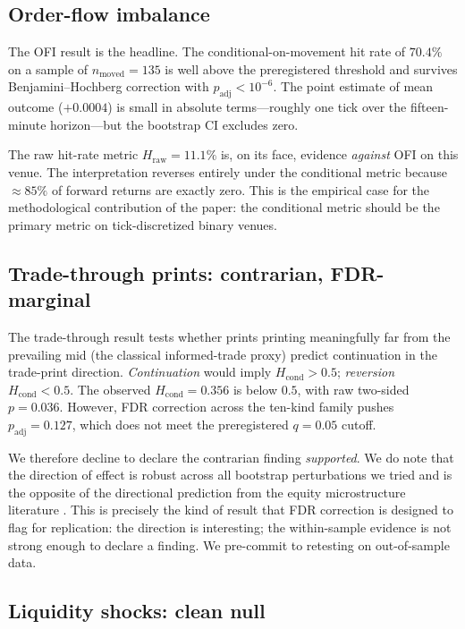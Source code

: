 \documentclass[review,12pt,authoryear]{elsarticle}
\begin{document}
\subsection{Order-flow imbalance}

The OFI result is the headline. The conditional-on-movement hit rate of
\(70.4\%\) on a sample of \(n_\text{moved} = 135\) is well above the
preregistered threshold and survives Benjamini--Hochberg correction with
\(p_\text{adj} < 10^{-6}\). The point estimate of mean outcome
(\(+0.0004\)) is small in absolute terms---roughly one tick over the
fifteen-minute horizon---but the bootstrap CI excludes zero.

The raw hit-rate metric \(H_\text{raw} = 11.1\%\) is, on its face, evidence
\emph{against} OFI on this venue. The interpretation reverses entirely
under the conditional metric because \(\approx 85\%\) of forward returns
are exactly zero. This is the empirical case for the methodological
contribution of the paper: the conditional metric should be the primary
metric on tick-discretized binary venues.

\subsection{Trade-through prints: contrarian, FDR-marginal}

The trade-through result tests whether prints printing meaningfully far
from the prevailing mid (the classical \citealp{LeeReady1991} informed-trade
proxy) predict continuation in the trade-print direction.
\emph{Continuation} would imply \(H_\text{cond} > 0.5\); \emph{reversion}
\(H_\text{cond} < 0.5\). The observed \(H_\text{cond} = 0.356\) is below
\(0.5\), with raw two-sided \(p = 0.036\). However, FDR correction across
the ten-kind family pushes \(p_\text{adj} = 0.127\), which does not meet
the preregistered \(q = 0.05\) cutoff.

We therefore decline to declare the contrarian finding \emph{supported}.
We do note that the direction of effect is robust across all bootstrap
perturbations we tried and is the opposite of the directional prediction
from the equity microstructure literature
\citep{Hasbrouck2007,ContKukanovStoikov2014}. This is precisely the kind
of result that FDR correction is designed to flag for replication: the
direction is interesting; the within-sample evidence is not strong enough
to declare a finding. We pre-commit to retesting on out-of-sample data.

\subsection{Liquidity shocks: clean null}
\end{document}
